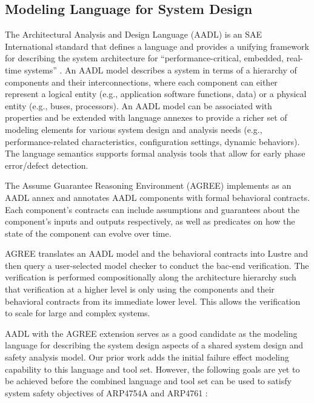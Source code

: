 \subsection{Modeling Language for System Design}
\label{subsec:aadl-agree}
The Architectural Analysis and Design Language (AADL)
\cite{FeilerModelBasedEngineering2012} is an SAE International standard \cite{AADL_Standard} that defines a language and provides a unifying framework for describing the system architecture for ``performance-critical, embedded, real-time systems'' \cite{AADL_Standard}. An AADL model describes a system in terms of a hierarchy of components and their interconnections, where each component can either represent a logical entity (e.g., application software functions, data) or a physical entity (e.g., buses, processors). An AADL model can be associated with properties and be extended with language annexes to provide a richer set of modeling elements for various system design and analysis needs (e.g., performance-related characteristics, configuration settings, dynamic behaviors). The language semantics supports formal analysis tools that allow for early phase error/defect detection.

The Assume Guarantee Reasoning
Environment (AGREE) \cite{NFM2012:CoGaMiWhLaLu} implements as an AADL annex and annotates AADL components with formal behavioral contracts. Each component's contracts can include assumptions and guarantees about the component's inputs and outputs respectively, as well as predicates on how the state of the component can evolve over time.

AGREE translates an AADL model and the behavioral contracts into Lustre\cite{Halbwachs91:IEEE} and then query a user-selected
model checker to conduct the bac-end verification. The verification is performed compositionally along the architecture hierarchy such that verification at a higher level is only using the components and their behavioral contracts from its immediate lower level. This allows the verification to scale for large and complex systems.

AADL with the AGREE extension serves as a good candidate as the modeling language for describing the system design aspects of a shared system design and safety analysis model. Our prior work \cite{Stewart17:IMBSA} adds the initial failure effect modeling capability to this language and tool set. However, the following goals are yet to be achieved before the combined language and tool set can be used to satisfy system safety objectives of ARP4754A \cite{SAE:ARP4754A} and ARP4761 \cite{SAE:ARP4761}:

